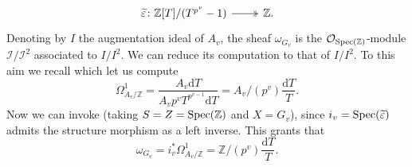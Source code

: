 \begin{ex}[]
\begin{enumerate}
\begin{equation*}
		\begin{tikzcd}[row sep = 0ex
			,/tikz/column 1/.append style={anchor=base east}
			,/tikz/column 2/.append style={anchor=base west}]
			\widetilde{\varepsilon}\colon 
			\mathbb{Z}[T]/ (T^{p^v} - 1)\arrow[r, "", twoheadrightarrow] &
			\mathbb{Z}
		.\end{tikzcd}
		\end{equation*} 
		Denoting by $I$ the augmentation ideal of $A_v$,
		the sheaf $\omega_{G_v}$ is the $\mathcal{O}_{ \operatorname{Spec}(\mathbb{Z}) }$-module
		$\mathcal{I}/\mathcal{I}^2$ associated to $I/I^2$.
		We can reduce its computation to that of $I/I^2$.
		To this aim we recall \cite[\S6.1, proposition 1.8(d) and example 1.10]{Liu}
		which let us compute
		\begin{equation*}
			\Omega^1_{A_v/\mathbb{Z}} = \frac{ A_v \mathrm{d}T }{ A_v p^v T^{p^{v-1}} \mathrm{d}T }
			= A_v / (p^v) \frac{ \mathrm{d}T }{ T }
		.\end{equation*}
		Now we can invoke 
		\cite[\href{https://stacks.math.columbia.edu/tag/0474}{Lemma 0474}]{SP}
		(taking $S = Z = \operatorname{Spec}(\mathbb{Z})$ and $X = G_v$),
		since $i_v = \operatorname{Spec}(\widetilde{\varepsilon})$ admits the structure morphism
		as a left inverse.
		This grants that
		\begin{equation*}
		\omega_{G_v} = i_v^* \Omega^1_{A_v/\mathbb{Z}} =
		\mathbb{Z}/ (p^v) \frac{ \mathrm{d}T }{ T }
		.\end{equation*}
		

\end{enumerate}
\end{ex}
